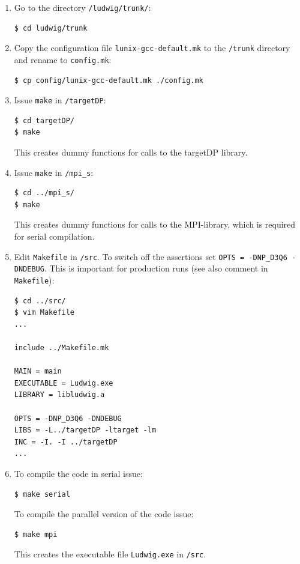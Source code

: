 \documentclass[11pt,twoside,a4paper]{article}
\begin{document}
\begin{enumerate}
\item Go to the directory \texttt{/ludwig/trunk/}: \\
\begin{lstlisting}
$ cd ludwig/trunk
\end{lstlisting}
\item Copy the configuration file \texttt{lunix-gcc-default.mk} to the \texttt{/trunk} directory 
and rename to \texttt{config.mk}: \\
\begin{lstlisting}
$ cp config/lunix-gcc-default.mk ./config.mk
\end{lstlisting}
\item Issue \texttt{make} in \texttt{/targetDP}: \\
\begin{lstlisting}
$ cd targetDP/
$ make 
\end{lstlisting}
This creates dummy functions for calls to the targetDP library.
\item Issue \texttt{make} in \texttt{/mpi\_s}: \\
\begin{lstlisting}
$ cd ../mpi_s/
$ make 
\end{lstlisting}
This creates dummy functions for calls to the MPI-library,
which is required for serial compilation.
\item Edit \texttt{Makefile} in \texttt{/src}. To switch off 
the assertions set \texttt{OPTS = -DNP\_D3Q6 -DNDEBUG}. This is
important for production runs (see also comment in \texttt{Makefile}): \\
\begin{lstlisting}
$ cd ../src/
$ vim Makefile
...

include ../Makefile.mk

MAIN = main
EXECUTABLE = Ludwig.exe
LIBRARY = libludwig.a

OPTS = -DNP_D3Q6 -DNDEBUG
LIBS = -L../targetDP -ltarget -lm
INC = -I. -I ../targetDP
...
\end{lstlisting}
\item To compile the code in serial issue: \\
\begin{lstlisting}
$ make serial
\end{lstlisting} 
To compile the parallel version of the code issue: \\
\begin{lstlisting}
$ make mpi
\end{lstlisting} 
This creates the executable file \texttt{Ludwig.exe} in \texttt{/src}.
\end{enumerate}
\end{document}
